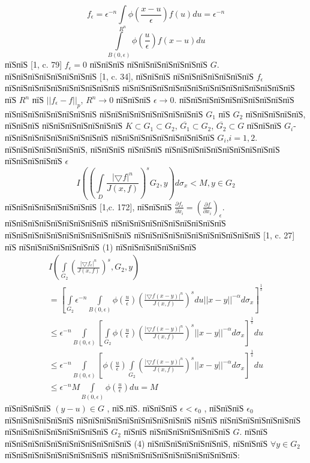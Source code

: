 \documentclass[a5paper, 12pt, openbib]{report}
\begin{document}
$$
f_{\epsilon}=\epsilon^{-n}\int\limits_{R^n}\phi\left(\frac{x-u}{\epsilon}\right)f(u)du=\epsilon^{-n}$$
$$\int\limits_{B(0,\epsilon)}\phi\left(\frac{u}{\epsilon}\right)f(x-u)du
$$
пїЅпїЅ [1, c. 79] $f_{\epsilon}=0$ пїЅпїЅпїЅ пїЅпїЅпїЅпїЅпїЅпїЅпїЅ $G$. пїЅпїЅпїЅпїЅпїЅпїЅпїЅпїЅ [1, c. 34], пїЅпїЅпїЅ пїЅпїЅпїЅпїЅпїЅпїЅпїЅ $f_{\epsilon}$ пїЅпїЅпїЅпїЅпїЅпїЅпїЅпїЅпїЅпїЅ пїЅпїЅпїЅпїЅпїЅпїЅпїЅпїЅпїЅпїЅпїЅпїЅпїЅпїЅпїЅ пїЅ $R^n$ пїЅ $||f_{\epsilon}-f||_p$, $R^{n}\to 0$  пїЅпїЅпїЅ $\epsilon\to 0$. пїЅпїЅпїЅпїЅпїЅпїЅпїЅпїЅпїЅпїЅ пїЅпїЅпїЅпїЅпїЅпїЅпїЅпїЅ пїЅпїЅпїЅпїЅпїЅпїЅпїЅпїЅпїЅ $G_1$  пїЅ $G_2$ пїЅпїЅпїЅпїЅпїЅ, пїЅпїЅпїЅ пїЅпїЅпїЅпїЅпїЅпїЅпїЅ  $K\subset G_{1} \subset G_{2}$, $\overline{G_1}\subset G_{2}$, $\overline{G_2}\subset G$ пїЅпїЅпїЅ $G_i$- пїЅпїЅпїЅпїЅпїЅпїЅпїЅпїЅпїЅ пїЅпїЅпїЅпїЅпїЅпїЅпїЅпїЅпїЅ $G_i$,$i=1,2$.
 	пїЅпїЅпїЅпїЅпїЅпїЅпїЅ, пїЅпїЅпїЅ пїЅпїЅпїЅ пїЅпїЅпїЅпїЅпїЅпїЅпїЅпїЅпїЅпїЅ пїЅпїЅпїЅпїЅпїЅ $\epsilon$
 	$$I\left(\left(
\int\limits_D\frac{|\bigtriangledown f|^{n}}{J(x,f)}
\right)^{s}G_{2},y\right) d\sigma_{x}<M, y\in G_2$$
пїЅпїЅпїЅпїЅпїЅпїЅпїЅпїЅ [1,c. 172], пїЅпїЅпїЅ $\frac{\partial f_\epsilon}{\partial x_i}=\left(\frac{\partial f}{\partial x_i}\right)_\epsilon$. пїЅпїЅпїЅпїЅпїЅпїЅпїЅпїЅпїЅ пїЅпїЅпїЅпїЅпїЅпїЅпїЅпїЅпїЅпїЅ пїЅпїЅпїЅпїЅпїЅпїЅпїЅпїЅпїЅпїЅпїЅ пїЅпїЅпїЅпїЅпїЅпїЅпїЅпїЅпїЅпїЅпїЅ [1, c. 27] пїЅ пїЅпїЅпїЅпїЅпїЅпїЅпїЅ (1) пїЅпїЅпїЅпїЅпїЅпїЅпїЅ 
\begin{multline}
I\left(\int\limits_{G_2}\left(\frac{|\bigtriangledown f_{\epsilon}|^{n}}{J(x,f)}\right)^s, G_{2},y\right)\\
=\left[ \int\limits_{G_2}\epsilon^{-n}\int\limits_{B(0,\epsilon)}\phi\left(\frac{u}{\epsilon}\right)\left(\frac{|\bigtriangledown f(x-y)|^{n}}{J(x,f)}\right)^{s}
du||x-y||^{-\alpha}d\sigma_{x}\right]^{\frac{1}{s}}\\
\leq\epsilon^{-n}\int\limits_{B(0,\epsilon)}\left[\int\limits_{G_2}\phi\left(\frac{u}{\epsilon}\right)\left(\frac{|\bigtriangledown f(x-y)|^{n}}{J(x,f)}\right)^{s}||x-y||^{-\alpha}d\sigma_{x}\right]^{\frac{1}{s}}du
\\\leq\epsilon^{-n}\int\limits_{B(0,\epsilon)}\left[\phi\left(\frac{u}{\epsilon}\right)\int\limits_{G_2}\left(\frac{|\bigtriangledown f(x-y)|^{n}}{J(x,f)}\right)^{s}||x-y||^{-\alpha}d\sigma_{x}\right]^{\frac{1}{s}}du\\
\leq\epsilon^{-n}M\int\limits_{B(0,\epsilon)}\phi\left(\frac{u}{\epsilon}\right)du=M
\end{multline}
пїЅпїЅпїЅпїЅ $(y-u)\in G$ , пїЅ.пїЅ. пїЅпїЅпїЅ $\epsilon<\epsilon_0$ , пїЅпїЅпїЅ $\epsilon_0$ пїЅпїЅпїЅпїЅпїЅпїЅ пїЅпїЅпїЅпїЅпїЅпїЅпїЅпїЅпїЅпїЅ пїЅпїЅ пїЅпїЅпїЅпїЅпїЅпїЅпїЅ пїЅпїЅпїЅпїЅпїЅпїЅпїЅпїЅпїЅ $G_2$ пїЅпїЅ пїЅпїЅпїЅпїЅпїЅпїЅпїЅ $G$. пїЅпїЅ пїЅпїЅпїЅпїЅпїЅпїЅпїЅпїЅпїЅпїЅпїЅ (4) пїЅпїЅпїЅпїЅпїЅпїЅпїЅ, пїЅпїЅпїЅ $\forall y\in G_2$ пїЅпїЅпїЅпїЅпїЅпїЅпїЅпїЅпїЅ пїЅпїЅпїЅпїЅпїЅпїЅпїЅпїЅпїЅпїЅпїЅ:
\end{document}
